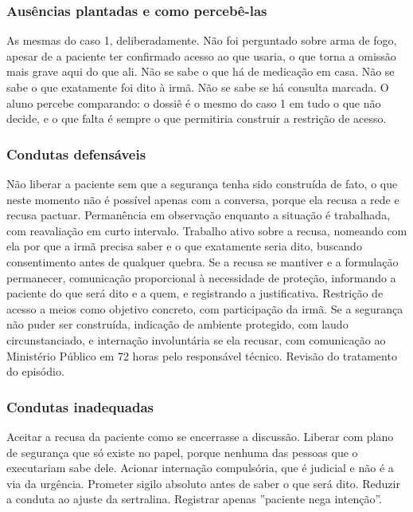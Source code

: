 \subsubsection*{Ausências plantadas e como percebê-las}

As mesmas do caso 1, deliberadamente. Não foi perguntado sobre arma de fogo, apesar de a paciente ter confirmado acesso ao que usaria, o que torna a omissão mais grave aqui do que ali. Não se sabe o que há de medicação em casa. Não se sabe o que exatamente foi dito à irmã. Não se sabe se há consulta marcada. O aluno percebe comparando: o dossiê é o mesmo do caso 1 em tudo o que não decide, e o que falta é sempre o que permitiria construir a restrição de acesso.

\subsubsection*{Condutas defensáveis}

Não liberar a paciente sem que a segurança tenha sido construída de fato, o que neste momento não é possível apenas com a conversa, porque ela recusa a rede e recusa pactuar. Permanência em observação enquanto a situação é trabalhada, com reavaliação em curto intervalo. Trabalho ativo sobre a recusa, nomeando com ela por que a irmã precisa saber e o que exatamente seria dito, buscando consentimento antes de qualquer quebra. Se a recusa se mantiver e a formulação permanecer, comunicação proporcional à necessidade de proteção, informando a paciente do que será dito e a quem, e registrando a justificativa. Restrição de acesso a meios como objetivo concreto, com participação da irmã. Se a segurança não puder ser construída, indicação de ambiente protegido, com laudo circunstanciado, e internação involuntária se ela recusar, com comunicação ao Ministério Público em 72 horas pelo responsável técnico. Revisão do tratamento do episódio.

\subsubsection*{Condutas inadequadas}

Aceitar a recusa da paciente como se encerrasse a discussão. Liberar com plano de segurança que só existe no papel, porque nenhuma das pessoas que o executariam sabe dele. Acionar internação compulsória, que é judicial e não é a via da urgência. Prometer sigilo absoluto antes de saber o que será dito. Reduzir a conduta ao ajuste da sertralina. Registrar apenas ''paciente nega intenção''.

